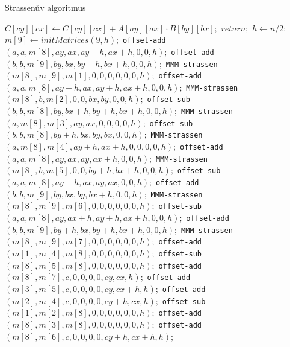 \documentclass[thesis=B,czech]{FITthesis}[2012/06/26]
\begin{document}
\begin{algorithm}[H]
	\caption{Strassenův algoritmus}\label{mmm-strassen}
	\begin{algorithmic}[1]
			\State \texttt{$C[cy][cx]\gets C[cy][cx] + A[ay][ax] \cdot B[by][bx];$}
			\State \texttt{$return;$}
		\EndIf
  		\State \texttt{$h \gets n/2;$} 
  		\State \texttt{$m[9] \gets initMatrices(9, h);$} 
	\State \texttt{offset-add$(a, a, m[8], ay, ax, ay + h, ax + h, 0, 0, h);$} 
	\State \texttt{offset-add$(b, b, m[9], by, bx, by + h, bx + h, 0, 0, h);$}
	\State \texttt{MMM-strassen$(m[8], m[9], m[1], 0, 0, 0, 0, 0, 0, h);$}
%	
	\State \texttt{offset-add$(a, a, m[8], ay + h, ax, ay + h, ax + h, 0, 0, h);$} 
	\State \texttt{MMM-strassen$(m[8], b, m[2], 0, 0, bx, by, 0, 0, h);$}
%	
	\State \texttt{offset-sub$(b, b, m[8], by, bx + h, by + h, bx + h, 0, 0, h);$} 
	\State \texttt{MMM-strassen$(a, m[8], m[3], ay, ax, 0, 0, 0, 0, h);$}
%	
	\State \texttt{offset-sub$(b, b, m[8], by + h, bx, by, bx, 0, 0, h);$} 
	\State \texttt{MMM-strassen$(a, m[8], m[4], ay + h, ax + h, 0, 0, 0, 0, h);$}
%	
	\State \texttt{offset-add$(a, a, m[8], ay, ax, ay, ax + h, 0, 0, h);$} 
	\State \texttt{MMM-strassen$(m[8], b, m[5], 0, 0, by + h, bx + h, 0, 0, h);$}
%	
	\State \texttt{offset-sub$(a, a, m[8], ay + h, ax, ay, ax, 0, 0, h);$} 
	\State \texttt{offset-add$(b, b, m[9], by, bx, by, bx + h, 0, 0, h);$}
	\State \texttt{MMM-strassen$(m[8], m[9], m[6], 0, 0, 0, 0, 0, 0, h);$}
%	
	\State \texttt{offset-sub$(a, a, m[8], ay, ax + h, ay + h, ax + h, 0, 0, h);$} 
	\State \texttt{offset-add$(b, b, m[9], by + h, bx, by + h, bx + h, 0, 0, h);$}
	\State \texttt{MMM-strassen$(m[8], m[9], m[7], 0, 0, 0, 0, 0, 0, h);$}
%	
	\State \texttt{offset-add$(m[1], m[4], m[8], 0, 0, 0, 0, 0, 0, h);$} 
	\State \texttt{offset-sub$(m[8], m[5], m[8], 0, 0, 0, 0, 0, 0, h);$}
	\State \texttt{offset-add$(m[8], m[7], c, 0, 0, 0, 0, cy, cx, h);$}
%	
	\State \texttt{offset-add$(m[3], m[5], c, 0, 0, 0, 0, cy, cx + h, h);$} 
%	
	\State \texttt{offset-add$(m[2], m[4], c, 0, 0, 0, 0, cy + h, cx, h);$} 
%	
	\State \texttt{offset-sub$(m[1], m[2], m[8], 0, 0, 0, 0, 0, 0, h);$} 
	\State \texttt{offset-add$(m[8], m[3], m[8], 0, 0, 0, 0, 0, 0, h);$}
	\State \texttt{offset-add$(m[8], m[6], c, 0, 0, 0, 0, cy + h, cx + h, h);$}		
		\EndProcedure
	\end{algorithmic}
\end{algorithm}
\end{document}
